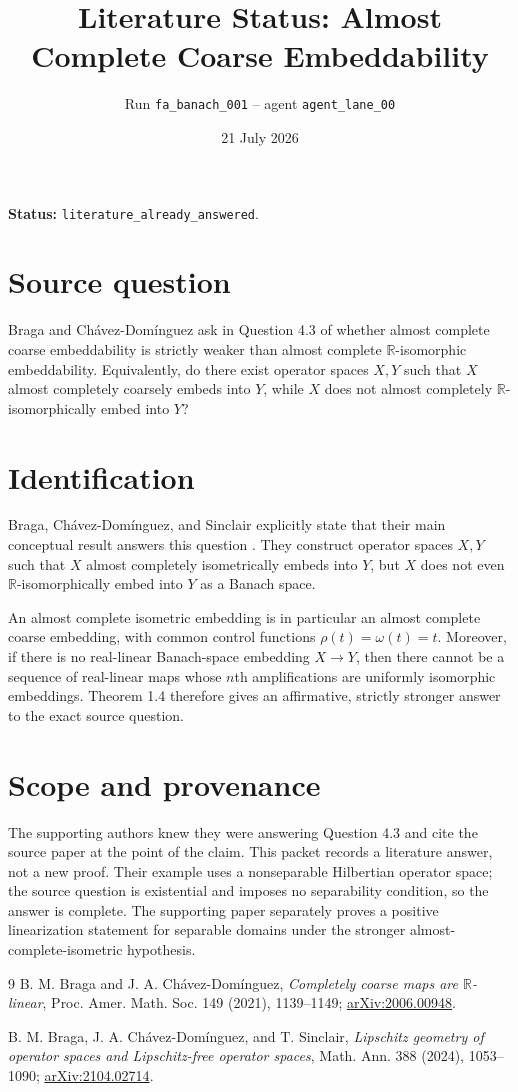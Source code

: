 \documentclass[11pt]{article}
\title{Literature Status: Almost Complete Coarse Embeddability}
\author{Run \texttt{fa\_banach\_001} -- agent \texttt{agent\_lane\_00}}
\date{21 July 2026}
\begin{document}
\maketitle

\textbf{Status:} \texttt{literature\_already\_answered}.

\section*{Source question}
Braga and Ch\'avez-Dom\'inguez ask in Question 4.3 of
\cite{source} whether almost complete coarse embeddability is strictly weaker
than almost complete $\mathbb R$-isomorphic embeddability.  Equivalently, do
there exist operator spaces $X,Y$ such that $X$ almost completely coarsely
embeds into $Y$, while $X$ does not almost completely
$\mathbb R$-isomorphically embed into $Y$?

\section*{Identification}
Braga, Ch\'avez-Dom\'inguez, and Sinclair explicitly state that their main
conceptual result answers this question \cite[Introduction and Theorem
1.4]{answer}.  They construct operator spaces $X,Y$ such that $X$ almost
completely isometrically embeds into $Y$, but $X$ does not even
$\mathbb R$-isomorphically embed into $Y$ as a Banach space.

An almost complete isometric embedding is in particular an almost complete
coarse embedding, with common control functions $\rho(t)=\omega(t)=t$.
Moreover, if there is no real-linear Banach-space embedding $X\to Y$, then
there cannot be a sequence of real-linear maps whose $n$th amplifications are
uniformly isomorphic embeddings.  Theorem 1.4 therefore gives an affirmative,
strictly stronger answer to the exact source question.

\section*{Scope and provenance}
The supporting authors knew they were answering Question 4.3 and cite the
source paper at the point of the claim.  This packet records a literature
answer, not a new proof.  Their example uses a nonseparable Hilbertian
operator space; the source question is existential and imposes no separability
condition, so the answer is complete.  The supporting paper separately proves
a positive linearization statement for separable domains under the stronger
almost-complete-isometric hypothesis.

\begin{thebibliography}{9}
B. M. Braga and J. A. Ch\'avez-Dom\'inguez,
\emph{Completely coarse maps are $\mathbb R$-linear},
Proc. Amer. Math. Soc. 149 (2021), 1139--1149;
\href{https://arxiv.org/abs/2006.00948}{arXiv:2006.00948}.

B. M. Braga, J. A. Ch\'avez-Dom\'inguez, and T. Sinclair,
\emph{Lipschitz geometry of operator spaces and Lipschitz-free operator
spaces}, Math. Ann. 388 (2024), 1053--1090;
\href{https://arxiv.org/abs/2104.02714}{arXiv:2104.02714}.
\end{thebibliography}
\end{document}
